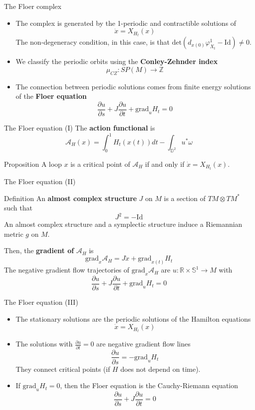 \documentclass{beamer}
\newcommand{\con}[1]{\mathbb{#1}}
\newcommand{\R}{\con{R}}
\begin{document}
\begin{frame}{The Floer complex}
	\begin{itemize}
		\item The complex is generated by the 1-periodic and contractible solutions of
		\[\dot{x} = X_{H_t}(x)\]
		The non-degeneracy condition, in this case, is that $\mathrm{det}(d_{x(0)}\varphi_{X_t}^1 - \mathrm{Id}) \neq 0$.
		\item We classify the periodic orbits using the {\bf Conley-Zehnder index}
		\[\mu_{CZ} : SP(M) \longrightarrow \con{Z}\]
		\item The connection between periodic solutions comes from finite energy solutions of the {\bf Floer equation}
		\[\frac{\partial u}{\partial s} + J \frac{\partial u}{\partial t} + \mathrm{grad}_uH_t = 0\]
	\end{itemize}
\end{frame}

\begin{frame}{The Floer equation (I)}
	The {\bf action functional} is
	\[\mathcal{A}_H(x) = \int_0^1 H_t(x(t)) dt - \int_{\con{D}^2} u^{\ast} \omega\]

	\begin{block}{Proposition}
		A loop $x$ is a critical point of $\mathcal{A}_H$ if and only if $\dot{x} = X_{H_t}(x)$.
	\end{block}
\end{frame}

\begin{frame}{The Floer equation (II)}
	\begin{block}{Definition}
		An {\bf almost complex structure} $J$ on $M$ is a section of $TM\otimes TM^{\ast}$ such that
		\[J^2 = - \mathrm{Id}\]
		An almost complex structure and a symplectic structure induce a Riemannian metric $g$ on $M$.
	\end{block}

	Then, the {\bf gradient of} $\mathcal{A}_H$ is
	\[\mathrm{grad}_x\mathcal{A}_H = J \dot{x} + \mathrm{grad}_{x(t)}H_t\]
	The negative gradient flow trajectories of $\mathrm{grad}_x\mathcal{A}_H$ are $u : \R \times \con{S}^1 \rightarrow M$ with
	\[\frac{\partial u}{\partial s} + J \frac{\partial u}{\partial t} + \mathrm{grad}_uH_t = 0\]
\end{frame}

\begin{frame}{The Floer equation (III)}
	\begin{itemize}
		\item The stationary solutions are the periodic solutions of the Hamilton equations
		\[\dot{x} = X_{H_t}(x)\]
		\item The solutions with $\frac{\partial u}{\partial t} = 0$ are negative gradient flow lines
		\[\frac{\partial u}{\partial s} = - \mathrm{grad}_uH_t\]
		They connect critical points (if $H$ does not depend on time).
		\item If $\mathrm{grad}_uH_t = 0$, then the Floer equation is the Cauchy-Riemann equation
		\[\frac{\partial u}{\partial s} + J \frac{\partial u}{\partial t} = 0\]
	\end{itemize}
\end{frame}
\end{document}
